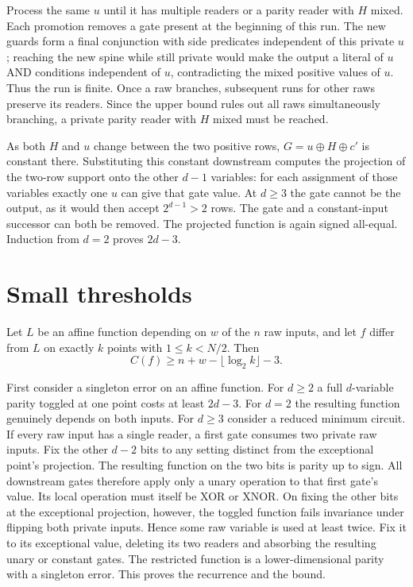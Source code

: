 \documentclass[11pt]{article}
\begin{document}
Process the same \(u\) until it has multiple readers or a parity reader with \(H\) mixed. Each promotion removes a gate present at the beginning of this run. The new guards form a final conjunction with side predicates independent of this private \(u\); reaching the new spine while still private would make the output a literal of \(u\) AND conditions independent of \(u\), contradicting the mixed positive values of \(u\). Thus the run is finite. Once a raw branches, subsequent runs for other raws preserve its readers. Since the upper bound rules out all raws simultaneously branching, a private parity reader with \(H\) mixed must be reached.

As both \(H\) and \(u\) change between the two positive rows, \(G=u\oplus H\oplus c'\) is constant there. Substituting this constant downstream computes the projection of the two-row support onto the other \(d-1\) variables: for each assignment of those variables exactly one \(u\) can give that gate value. At \(d\ge3\) the gate cannot be the output, as it would then accept \(2^{d-1}>2\) rows. The gate and a constant-input successor can both be removed. The projected function is again signed all-equal. Induction from \(d=2\) proves \(2d-3\).
\section{Small thresholds}
Let \(L\) be an affine function depending on \(w\) of the \(n\) raw inputs, and let \(f\) differ from \(L\) on exactly \(k\) points with \(1\le k<N/2\). Then
\[
                   C(f)\ge n+w-\lfloor\log_2 k\rfloor-3. \tag{1}
\]

First consider a singleton error on an affine function. For \(d\ge2\) a full \(d\)-variable parity toggled at one point costs at least \(2d-3\). For \(d=2\) the resulting function genuinely depends on both inputs. For \(d\ge3\) consider a reduced minimum circuit. If every raw input has a single reader, a first gate consumes two private raw inputs. Fix the other \(d-2\) bits to any setting distinct from the exceptional point's projection. The resulting function on the two bits is parity up to sign. All downstream gates therefore apply only a unary operation to that first gate's value. Its local operation must itself be XOR or XNOR. On fixing the other bits at the exceptional projection, however, the toggled function fails invariance under flipping both private inputs. Hence some raw variable is used at least twice. Fix it to its exceptional value, deleting its two readers and absorbing the resulting unary or constant gates. The restricted function is a lower-dimensional parity with a singleton error. This proves the recurrence and the bound.
\end{document}
